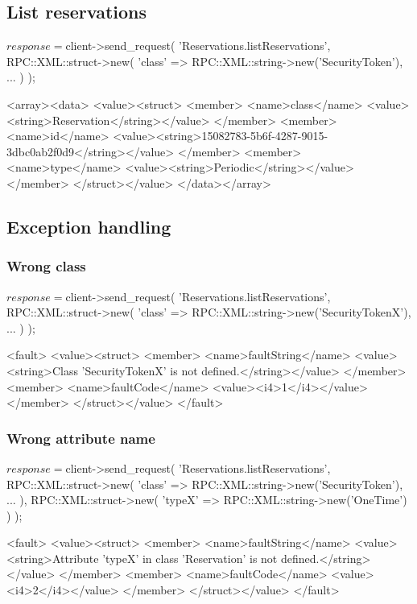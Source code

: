 \documentclass[a4paper]{report}
\begin{document}
\newpage
\subsection{List reservations}
\begin{PerlCmd}
$response = $client->send_request(
    'Reservations.listReservations',
    RPC::XML::struct->new(
        'class' => RPC::XML::string->new('SecurityToken'),
        ...
    )
);
\end{PerlCmd}
\begin{PerlResponse}
<array><data>
  <value><struct>
    <member>
      <name>class</name>
      <value><string>Reservation</string></value>
    </member>
    <member>
      <name>id</name>
      <value><string>15082783-5b6f-4287-9015-3dbc0ab2f0d9</string></value>
    </member>
    <member>
      <name>type</name>
      <value><string>Periodic</string></value>
    </member>
  </struct></value>
</data></array>
\end{PerlResponse}

\newpage
\subsection{Exception handling}
\subsubsection{Wrong class}
\begin{PerlCmd}
$response = $client->send_request(
    'Reservations.listReservations',
    RPC::XML::struct->new(
        'class' => RPC::XML::string->new('SecurityTokenX'),
        ...
    )
);
\end{PerlCmd}
\begin{PerlResponse}
<fault>
  <value><struct>
    <member>
      <name>faultString</name>
      <value><string>Class 'SecurityTokenX' is not defined.</string></value>
    </member>
    <member>
      <name>faultCode</name>
      <value><i4>1</i4></value>
    </member>
  </struct></value>
</fault>
\end{PerlResponse}

\subsubsection{Wrong attribute name}
\begin{PerlCmd}
$response = $client->send_request(
    'Reservations.listReservations',
    RPC::XML::struct->new(
        'class' => RPC::XML::string->new('SecurityToken'),
        ...
    ),
    RPC::XML::struct->new(
        'typeX' => RPC::XML::string->new('OneTime')
    )
);
\end{PerlCmd}
\begin{PerlResponse}
<fault>
  <value><struct>
    <member>
      <name>faultString</name>
      <value><string>Attribute 'typeX' in class 'Reservation' is not defined.</string></value>
    </member>
    <member>
      <name>faultCode</name>
      <value><i4>2</i4></value>
    </member>
  </struct></value>
</fault>
\end{PerlResponse}
\end{document}
